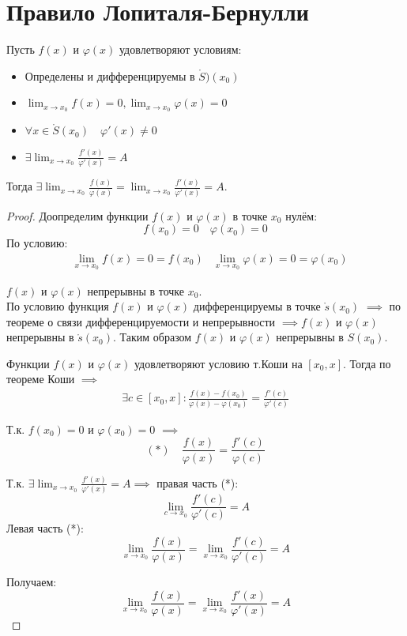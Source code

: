 \section{Правило Лопиталя-Бернулли}

\begin{theorem}
  Пусть $f(x)$ и  $\varphi(x)$ удовлетворяют условиям:
  \begin{itemize}
    \item Определены и дифференцируемы в $\mathring{S})(x_0)$
    \item $\lim_{x \to x_0} f(x) = 0, \lim_{x \to x_0} \varphi(x) = 0$
    \item $\forall x \in \mathring{S}(x_0) \quad \varphi'(x) \neq 0$
    \item $\exists \lim_{x \to x_0} \frac{f'(x)}{\varphi'(x)} = A$
  \end{itemize}
  Тогда $\exists \lim_{x \to x_0} \frac{f(x)}{\varphi(x)} = \lim_{x \to x_0} \frac{f'(x)}{\varphi'(x)} = A$.
\end{theorem}
\begin{proof}
  Доопределим функции $f(x)$ и $\varphi(x)$ в точке $x_0$ нулём: \[
  f(x_0) = 0 \quad \varphi(x_0) = 0
  \] 
  По условию:
  \begin{align*}
    &\lim_{x \to x_0} f(x) = 0 = f(x_0)
    &\lim_{x \to x_0} \varphi(x) = 0 = \varphi(x_0)
  \end{align*}
  
  $f(x)$ и  $\varphi(x)$ непрерывны в точке $x_0$.\\
  По условию функция $f(x)$ и  $\varphi(x)$ дифференцируемы в точке $\mathring{s}(x_0)$ $\implies$ по теореме о связи дифференцируемости и непрерывности $\implies f(x)$ и $\varphi(x)$ непрерывны в $\mathring{s}(x_0)$. Таким образом $f(x)$ и  $\varphi(x)$ непрерывны в $S(x_0)$.

  Функции $f(x)$ и  $\varphi(x)$ удовлетворяют условию т.Коши на $[x_0, x]$. Тогда по теореме Коши $\implies$ 
  \begin{gather*}
    \exists c \in [x_0, x] : \frac{f(x) - f(x_0)}{\varphi(x) - \varphi(x_0)} = \frac{f'(c)}{\varphi'(c)} \tag{*} 
  \end{gather*}

  Т.к. $f(x_0) = 0$ и $\varphi(x_0) = 0$ $\implies$ \[
    (*) \quad \boxed{\frac{f(x)}{\varphi(x)} = \frac{f'(c)}{\varphi(c)}}
  \] 

  Т.к. $\exists \lim_{x \to x_0} \frac{f'(x)}{\varphi'(x)} = A \implies$ правая часть (*): \[
  \lim_{c \to x_0} \frac{f'(c)}{\varphi'(c)} = A
  \] 
  Левая часть (*): \[
  \lim_{x \to x_0} \frac{f(x)}{\varphi(x)} = \lim_{x \to x_0} \frac{f'(c)}{\varphi'(c)} = A
  \] 

  Получаем: \[
  \lim_{x \to x_0} \frac{f(x)}{\varphi(x)} = \lim_{x \to x_0} \frac{f'(x)}{\varphi'(x)} = A
  \] 
\end{proof}


